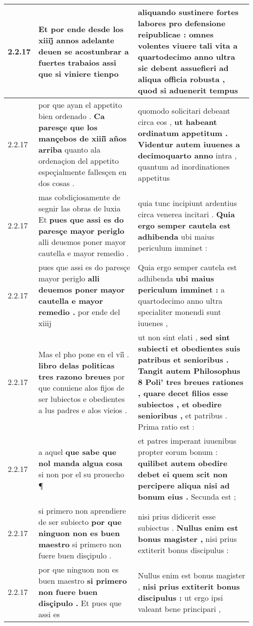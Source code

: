 \begin{tabular}{|p{1cm}|p{6.5cm}|p{6.5cm}|}
2.2.17 & Et por ende desde los xiiij̊ annos adelante \textbf{ deuen se acostunbrar a fuertes trabaios } assi que si viniere tienpo & aliquando sustinere fortes labores pro defensione reipublicae : \textbf{ omnes volentes viuere tali vita a quartodecimo anno ultra sic debent assuefieri ad aliqua officia robusta , } quod si aduenerit tempus \\\hline
2.2.17 & por que ayan el appetito bien ordenado . \textbf{ Ca paresçe que los mançebos de xiiii̊ años arriba } quanto ala ordenaçion del appetito espeçialmente fallesçen en dos cosas . & quomodo solicitari debeant circa eos , \textbf{ ut habeant ordinatum appetitum . Videntur autem iuuenes a decimoquarto anno } intra , quantum ad inordinationes appetitus \\\hline
2.2.17 & mas cobdiçiosamente de segnir las obras de luxia Et \textbf{ pues que assi es do paresçe mayor periglo } alli deuemos poner mayor cautella e mayor remedio . & quia tunc incipiunt ardentius circa venerea incitari . \textbf{ Quia ergo semper cautela est adhibenda } ubi maius periculum imminet : \\\hline
2.2.17 & pues que assi es do paresçe mayor periglo \textbf{ alli deuemos poner mayor cautella e mayor remedio . } por ende del xiiij & Quia ergo semper cautela est adhibenda \textbf{ ubi maius periculum imminet : } a quartodecimo anno ultra specialiter monendi sunt iuuenes , \\\hline
2.2.17 & Mas el pho pone en el vii̊ . \textbf{ libro delas politicas tres razono breues } por que conuiene alos fijos de ser lubiectos e obedientes a lus padres e alos vieios . & ut non sint elati , \textbf{ sed sint subiecti et obedientes suis patribus et senioribus . Tangit autem Philosophus 8 Poli’ tres breues rationes , quare decet filios esse subiectos , et obedire senioribus , } et patribus . Prima ratio est : \\\hline
2.2.17 & a aquel \textbf{ que sabe que nol manda algua cosa } si non por el su prouecho ¶ & et patres imperant iuuenibus propter eorum bonum : \textbf{ quilibet autem obedire debet ei quem scit non percipere aliqua nisi ad bonum eius . } Secunda est ; \\\hline
2.2.17 & si primero non aprendiere de ser subiecto \textbf{ por que ninguon non es buen maestro } si primero non fuere buen disçipulo . & nisi prius didicerit esse subiectus . \textbf{ Nullus enim est bonus magister , } nisi prius extiterit bonus discipulus : \\\hline
2.2.17 & por que ninguon non es buen maestro \textbf{ si primero non fuere buen disçipulo . } Et pues que assi es & Nullus enim est bonus magister , \textbf{ nisi prius extiterit bonus discipulus : } ut ergo ipsi valeant bene principari , \\\hline

\end{tabular}
